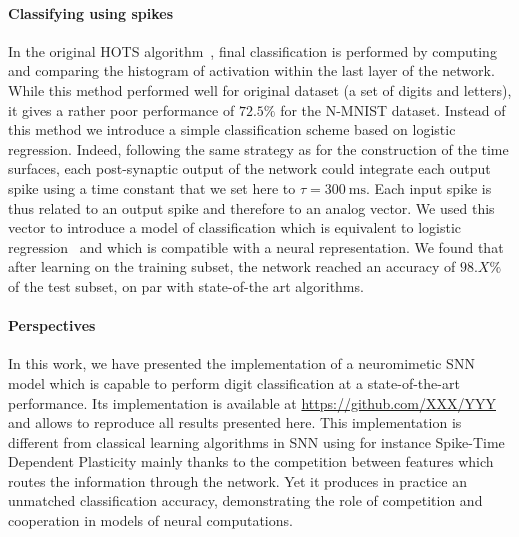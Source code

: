 \documentclass[12pt]{article}
\newcommand{\citep}[1]{\parencite{#1}}
\newcommand{\citet}[1]{\textcite{#1}}
\newcommand{\ms}{\si{\milli\second}}%
\begin{document}
\paragraph*{Classifying using spikes}
In the original HOTS algorithm~\citet{Lagorce17}, final classification is performed by computing and comparing the histogram of activation within the last layer of the network. %
While this method performed well for original dataset (a set of digits and letters), it gives a rather poor performance of $72.5\%$ for the N-MNIST dataset. 
Instead of this method we introduce a simple classification scheme based on logistic regression. Indeed, following the same strategy as for the construction of the time surfaces, each post-synaptic output of the network could integrate each output spike using a time constant that we set here to $\tau=300~\ms$. Each input spike is thus related to an output spike and therefore to an analog vector. We used this vector to introduce a model of classification which is equivalent to logistic regression~\citep{Berens12} and which is compatible with a neural representation. We found that after learning on the training subset, the network reached an accuracy of $98.X\%$ of the test subset, on par with state-of-the art algorithms.
%
\paragraph*{Perspectives}
In this work, we have presented the implementation of a neuromimetic SNN model which is capable to perform digit classification at a state-of-the-art performance. Its implementation is available at \url{https://github.com/XXX/YYY} and allows to reproduce all results presented here. %
This implementation is different from classical learning algorithms in SNN using for instance Spike-Time Dependent Plasticity mainly thanks to the competition between features which routes the information through the network. Yet it produces in practice an unmatched classification accuracy, demonstrating the role of competition and cooperation in models of neural computations.
%
\end{document}
